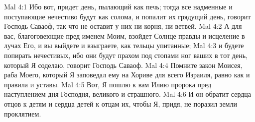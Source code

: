 \vs Mal 4:1 Ибо вот, придет день, пылающий как печь; тогда все надменные и поступающие нечестиво будут как солома, и попалит их грядущий день, говорит Господь Саваоф, так что не оставит у них ни корня, ни ветвей.
\vs Mal 4:2 А для вас, благоговеющие пред именем Моим, взойдет Солнце правды и исцеление в лучах Его, и вы выйдете и взыграете, как тельцы упитанные;
\vs Mal 4:3 и будете попирать нечестивых, ибо они будут прахом под стопами ног ваших в тот день, который Я соделаю, говорит Господь Саваоф.
\vs Mal 4:4 Помните закон Моисея, раба Моего, который Я заповедал ему на Хориве для всего Израиля, равно как и правила и уставы.
\vs Mal 4:5 Вот, Я пошлю к вам Илию пророка пред наступлением дня Господня, великого и страшного.
\vs Mal 4:6 И он обратит сердца отцов к детям и сердца детей к отцам их, чтобы Я, придя, не поразил земли проклятием.
